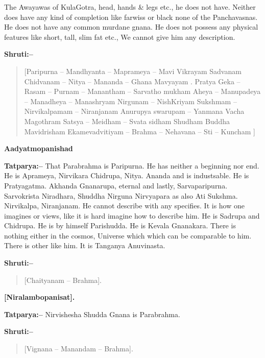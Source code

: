 The Awayawas of KulaGotra, head, hands \& legs etc., he does not have. Neither does have any kind of completion like farwiss or black none of the Panchavasnas. He does not have any common murdane gnana. He does not possess any physical features like short, tall, slim fat etc., We cannot give him any description.

\textbf{Shruti:–}

\begin{verse}
[Paripurna – Mandhyanta – Maprameya – Mavi Vikrayam  Sadvanam Chidvanam – Nitya – Mananda – Ghana Mavyayam . Pratya Geka – Rasam – Purnam – Manantham – Sarvatho mukham  Aheya – Manupadeya – Manadheya – Manashryam  Nirgunam – NishKriyam Sukshmam – Nirvikalpamam – Niranjanam  Anurupya swarupam – Yanmana Vacha Magothram  Satsya – Meidham – Svata sidham Shudham Buddha Mavidrisham  Ekamevadvitiyam – Brahma – Nehavana – Sti – Kuncham ]
\end{verse}

\begin{flushright}
\textbf{Aadyatmopanishad}
\end{flushright}

\textbf{Tatparya:–} That Parabrahma is Paripurna. He has neither a beginning nor end. He is Aprameya, Nirvikara Chidrupa, Nitya. Ananda and is industsable. He is Pratyagatma. Akhanda Gnanarupa, eternal and lastly, Sarvaparipurna. Sarvokrista Niradhara, Shuddha Nirguna Nirvyapara as also Ati Sukshma. Nirvikalpa, Niranjanam. He cannot describe with any specifies. It is how one imagines or views, like it is hard imagine how to describe him. He is Sadrupa and Chidrupa. He is by himself Parishudda. He is Kevala Gnanakara. There is nothing either in the cosmos, Universe which which can be comparable to him. There is other like him. It is Tanganya Anuvinasta.

\textbf{Shruti:–}

\begin{verse}
[Chaityanam – Brahma].
\end{verse}

\begin{flushright}
\textbf{[Niralambopanisat].}
\end{flushright}

\textbf{Tatparya:–} Nirvishesha Shudda Gnana is Parabrahma.

\textbf{Shruti:–}

\begin{verse}
[Vignana – Manandam – Brahma].
\end{verse}

